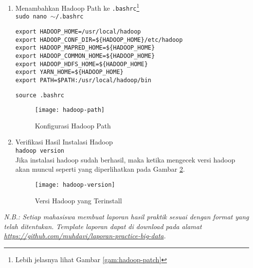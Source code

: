 \documentclass[a4paper]{tufte-handout}
\begin{document}
\begin{enumerate}
\item Menambahkan Hadoop Path ke {\tt .bashrc}\footnote{Lebih jelasnya lihat Gambar \ref{gam:hadoop-patch}} \\
{\tt sudo nano $\sim$/.bashrc} \\
\begin{lstlisting}
export HADOOP_HOME=/usr/local/hadoop
export HADOOP_CONF_DIR=${HADOOP_HOME}/etc/hadoop
export HADOOP_MAPRED_HOME=${HADOOP_HOME}
export HADOOP_COMMON_HOME=${HADOOP_HOME}
export HADOOP_HDFS_HOME=${HADOOP_HOME}
export YARN_HOME=${HADOOP_HOME}
export PATH=$PATH:/usr/local/hadoop/bin
\end{lstlisting}
{\tt source .bashrc}
\begin{figure}[!ht]
\centering
\texttt{[image: hadoop-path]}
\caption{Konfigurasi Hadoop Path}
\label{gam:hadoop-path}
\end{figure}

\item Verifikasi Hasil Instalasi Hadoop \\
{\tt hadoop version} \\
Jika instalasi hadoop sudah berhasil, maka ketika mengecek versi hadoop akan muncul seperti yang diperlihatkan pada Gambar \ref{gam:hadoop-version}.
\begin{figure}[!ht]
\texttt{[image: hadoop-version]}
\caption{Versi Hadoop yang Terinstall}
\label{gam:hadoop-version}
\end{figure}
\end{enumerate}
 
\hrulefill

\clearpage
{}
\textit{N.B.: Setiap mahasiswa membuat laporan hasil praktik sesuai dengan format yang telah ditentukan. Template laporan dapat di download pada alamat \url{https://github.com/muhdavi/laporan-practice-big-data}.}
\end{document}
